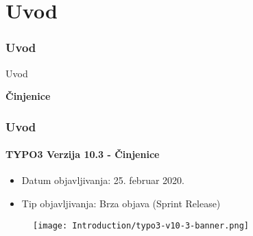 %

\section{Uvod}
\begin{frame}[fragile]
	\frametitle{Uvod}

	\begin{center}\huge{Uvod}\end{center}
	\begin{center}\huge{\color{typo3darkgrey}\textbf{Činjenice}}\end{center}

\end{frame}


\begin{frame}[fragile]
	\frametitle{Uvod}
	\framesubtitle{TYPO3 Verzija 10.3 - Činjenice}

	\begin{itemize}
		\item Datum objavljivanja: 25. februar 2020.
		\item Tip objavljivanja: Brza objava (Sprint Release)
	\end{itemize}

	\begin{figure}
		\texttt{[image: Introduction/typo3-v10-3-banner.png]}
	\end{figure}

\end{frame}


